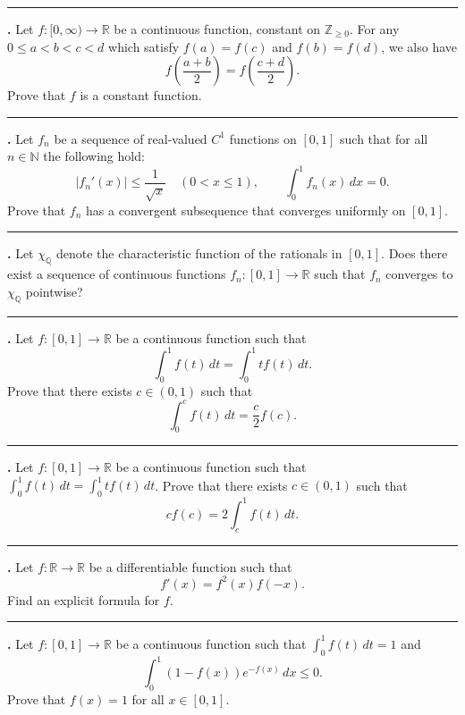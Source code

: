 \documentclass[11pt]{article}
\newcounter{probnum}
\newenvironment{problembox}{\par\noindent\rule{\linewidth}{0.5pt}\vspace{5pt}\par}{\vspace{2pt}}
\begin{document}
\begin{problembox}
\textbf{\theprobnum.} Let $f : [0,\infty) \to \mathbb{R}$ be a continuous function, constant on $\mathbb{Z}_{\ge 0}$. For any $0 \le a < b < c < d$ which satisfy $f(a) = f(c)$ and $f(b) = f(d)$, we also have
\[
f\left(\frac{a+b}{2}\right) = f\left(\frac{c+d}{2}\right).
\]
Prove that $f$ is a constant function.
\end{problembox}

\begin{problembox}
\textbf{\theprobnum.} Let $f_n$ be a sequence of real-valued $C^1$ functions on $[0,1]$ such that for all $n \in \mathbb{N}$ the following hold:
\[
|f_n'(x)| \le \frac{1}{\sqrt{x}} \quad (0 < x \le 1), \qquad \int_0^1 f_n(x)\,dx = 0.
\]
Prove that $f_n$ has a convergent subsequence that converges uniformly on $[0,1]$.
\end{problembox}

\begin{problembox}
\textbf{\theprobnum.} Let $\chi_{\mathbb{Q}}$ denote the characteristic function of the rationals in $[0,1]$. Does there exist a sequence of continuous functions $f_n : [0,1] \to \mathbb{R}$ such that $f_n$ converges to $\chi_{\mathbb{Q}}$ pointwise?
\end{problembox}

\begin{problembox}
\textbf{\theprobnum.} Let $f : [0,1] \to \mathbb{R}$ be a continuous function such that
\[
\int_0^1 f(t)\,dt = \int_0^1 t f(t)\,dt.
\]
Prove that there exists $c \in (0,1)$ such that
\[
\int_0^c f(t)\,dt = \frac{c}{2} f(c).
\]
\end{problembox}

\begin{problembox}
\textbf{\theprobnum.} Let $f : [0,1] \to \mathbb{R}$ be a continuous function such that $\displaystyle\int_0^1 f(t)\,dt = \int_0^1 t f(t)\,dt$. Prove that there exists $c \in (0,1)$ such that
\[
c f(c) = 2 \int_c^1 f(t)\,dt.
\]
\end{problembox}

\begin{problembox}
\textbf{\theprobnum.} Let $f : \mathbb{R} \to \mathbb{R}$ be a differentiable function such that
\[
f'(x) = f^2(x) f(-x).
\]
Find an explicit formula for $f$.
\end{problembox}

\begin{problembox}
\textbf{\theprobnum.} Let $f : [0,1] \to \mathbb{R}$ be a continuous function such that $\displaystyle\int_0^1 f(t)\,dt = 1$ and
\[
\int_0^1 (1-f(x)) e^{-f(x)}\,dx \le 0.
\]
Prove that $f(x) = 1$ for all $x \in [0,1]$.
\end{problembox}
\end{document}
